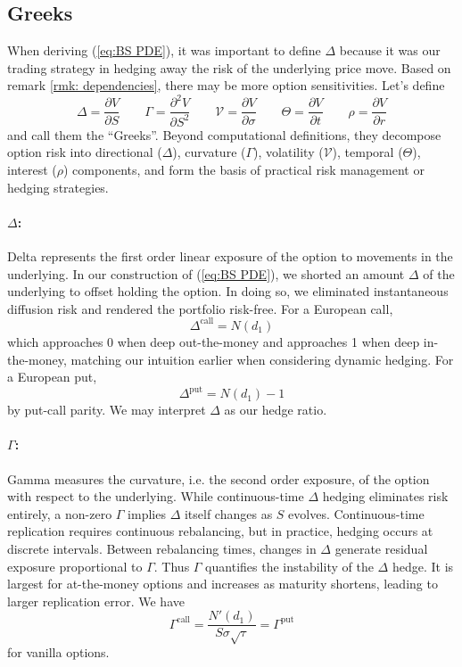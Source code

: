 \documentclass[12pt]{article}
\theoremstyle{definition}
\theoremstyle{remark}
\begin{document}
\subsection{Greeks}
When deriving (\ref{eq:BS PDE}), it was important to define $\Delta$ because it was our trading strategy in hedging away the risk of the underlying price move. Based on remark \ref{rmk: dependencies}, there may be more option sensitivities. Let's define
$$
\Delta = \frac{\partial V}{\partial S}
\qquad
\Gamma = \frac{\partial^2 V}{\partial S^2}
\qquad
\mathcal{V} = \frac{\partial V}{\partial \sigma}
\qquad
\Theta = \frac{\partial V}{\partial t}
\qquad
\rho = \frac{\partial V}{\partial r}
$$
and call them the ``Greeks''. Beyond computational definitions, they decompose option risk into directional ($\Delta$), curvature ($\Gamma$), volatility ($\mathcal{V}$), temporal ($\Theta$), interest ($\rho$) components, and form the basis of practical risk management or hedging strategies.

\paragraph{$\Delta$:} Delta represents the first order linear exposure of the option to movements in the underlying. In our construction of (\ref{eq:BS PDE}), we shorted an amount $\Delta$ of the underlying to offset holding the option. In doing so, we eliminated instantaneous diffusion risk and rendered the portfolio risk-free. For a European call,
$$
\Delta^\mathrm{call} = N(d_1)
$$
which approaches 0 when deep out-the-money and approaches 1 when deep in-the-money, matching our intuition earlier when considering dynamic hedging. For a European put,
$$
\Delta^\mathrm{put} = N(d_1) - 1
$$
by put-call parity. We may interpret $\Delta$ as our hedge ratio.

\paragraph{$\Gamma$:} Gamma measures the curvature, i.e. the second order exposure, of the option with respect to the underlying. While continuous-time $\Delta$ hedging eliminates risk entirely, a non-zero $\Gamma$ implies $\Delta$ itself changes as $S$ evolves. Continuous-time replication requires continuous rebalancing, but in practice, hedging occurs at discrete intervals. Between rebalancing times, changes in $\Delta$ generate residual exposure proportional to $\Gamma$. Thus $\Gamma$ quantifies the instability of the $\Delta$ hedge. It is largest for at-the-money options and increases as maturity shortens, leading to larger replication error. We have
$$
\Gamma^\mathrm{call} = \frac{N'(d_1)}{S\sigma\sqrt{\tau}} = \Gamma^\mathrm{put}
$$
for vanilla options.
\end{document}
